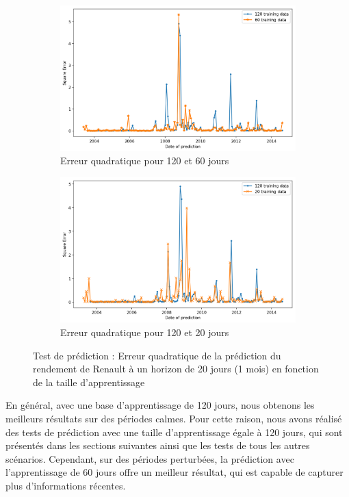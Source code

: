 \begin{figure}[H]
\centering
\begin{subfigure}{.5\textwidth}
\centering
\includegraphics[width=.9\linewidth, scale=0.2]
{plot/Predict1.png}
\caption{Erreur quadratique pour 120 et 60 jours}
\label{fig:p1}
\end{subfigure}%
\begin{subfigure}{.5\textwidth}
\centering
\includegraphics[width=.9\linewidth, scale=0.2]
{plot/Predict2.png}
\caption{Erreur quadratique pour 120 et 20 jours}
\label{fig:p2}
\end{subfigure}
\caption{Test de prédiction : Erreur quadratique de la prédiction du rendement de Renault à un horizon de 20 jours (1 mois) en fonction de la taille d'apprentissage}
\label{fig:tp_mse}
\end{figure}

En général, avec une base d'apprentissage de 120 jours, nous obtenons les meilleurs résultats sur des périodes calmes. Pour cette raison, nous avons réalisé des tests de prédiction avec une taille d'apprentissage égale à 120 jours, qui sont présentés dans les sections suivantes ainsi que les tests de tous les autres scénarios. Cependant, sur des périodes perturbées, la prédiction avec l'apprentissage de 60 jours offre un meilleur résultat, qui est capable de capturer plus d'informations récentes.\\

